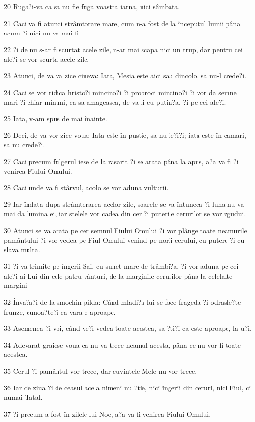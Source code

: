 \par 20 Ruga?i-va ca sa nu fie fuga voastra iarna, nici sâmbata.
\par 21 Caci va fi atunci strâmtorare mare, cum n-a fost de la începutul lumii pâna acum ?i nici nu va mai fi.
\par 22 ?i de nu s-ar fi scurtat acele zile, n-ar mai scapa nici un trup, dar pentru cei ale?i se vor scurta acele zile.
\par 23 Atunci, de va va zice cineva: Iata, Mesia este aici sau dincolo, sa nu-l crede?i.
\par 24 Caci se vor ridica hristo?i mincino?i ?i prooroci mincino?i ?i vor da semne mari ?i chiar minuni, ca sa amageasca, de va fi cu putin?a, ?i pe cei ale?i.
\par 25 Iata, v-am spus de mai înainte.
\par 26 Deci, de va vor zice voua: Iata este în pustie, sa nu ie?i?i; iata este în camari, sa nu crede?i.
\par 27 Caci precum fulgerul iese de la rasarit ?i se arata pâna la apus, a?a va fi ?i venirea Fiului Omului.
\par 28 Caci unde va fi stârvul, acolo se vor aduna vulturii.
\par 29 Iar îndata dupa strâmtorarea acelor zile, soarele se va întuneca ?i luna nu va mai da lumina ei, iar stelele vor cadea din cer ?i puterile cerurilor se vor zgudui.
\par 30 Atunci se va arata pe cer semnul Fiului Omului ?i vor plânge toate neamurile pamântului ?i vor vedea pe Fiul Omului venind pe norii cerului, cu putere ?i cu slava multa.
\par 31 ?i va trimite pe îngerii Sai, cu sunet mare de trâmbi?a, ?i vor aduna pe cei ale?i ai Lui din cele patru vânturi, de la marginile cerurilor pâna la celelalte margini.
\par 32 Înva?a?i de la smochin pilda: Când mladi?a lui se face frageda ?i odrasle?te frunze, cunoa?te?i ca vara e aproape.
\par 33 Asemenea ?i voi, când ve?i vedea toate acestea, sa ?ti?i ca este aproape, la u?i.
\par 34 Adevarat graiesc voua ca nu va trece neamul acesta, pâna ce nu vor fi toate acestea.
\par 35 Cerul ?i pamântul vor trece, dar cuvintele Mele nu vor trece.
\par 36 Iar de ziua ?i de ceasul acela nimeni nu ?tie, nici îngerii din ceruri, nici Fiul, ci numai Tatal.
\par 37 ?i precum a fost în zilele lui Noe, a?a va fi venirea Fiului Omului.
